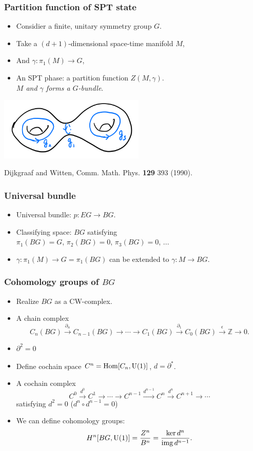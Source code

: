 \documentclass[xcolor=table, aspectratio=43,ignorenonframetext]{beamer}
\DeclareMathOperator{\img}{img}
\DeclareMathOperator{\hhom}{Hom}
\begin{document}
\begin{frame}
	\frametitle{Partition function of SPT state}
	\begin{itemize}
		\item Considier a finite, unitary symmetry group $G$.
		\item Take a $(d+1)$-dimensional space-time manifold $M$,
		\item And $\gamma:\pi_1(M)\rightarrow G$,
		\item An SPT phase: a partition function $Z(M,\gamma)$.\\
		\emph{$M$ and $\gamma$ forms a $G$-bundle}.
	\end{itemize}
	\begin{center}
		\includegraphics[height=3cm]{manifold}
	\end{center}
	{\small Dijkgraaf and Witten, Comm. Math. Phys. \textbf{129} 393 (1990).}
\end{frame}

\begin{frame}
	\frametitle{Universal bundle}
	\begin{itemize}
		\item Universal bundle: $p: EG \rightarrow BG$.
		\item Classifying space: $BG$ satisfying\\
		$\pi_1(BG) = G$, $\pi_2(BG)=0$, $\pi_3(BG)=0$, ...
		\item $\gamma:\pi_1(M)\rightarrow G=\pi_1(BG)$ can be extended to $\gamma:M\rightarrow BG$.
	\end{itemize}
\end{frame}

\begin{frame}
	\frametitle{Cohomology groups of $BG$}
	\begin{itemize}
		\item Realize $BG$ as a CW-complex.
		\item A chain complex
		\[C_n(BG)\xrightarrow{\partial_n}
		C_{n-1}(BG)\rightarrow\cdots\rightarrow
		C_1(BG)\xrightarrow{\partial_1}
		C_0(BG)\xrightarrow{\epsilon}\mathbb Z\rightarrow0.\]
		\item $\partial^2=0$
		\item Define cochain space $C^n=\hhom[C_n,\text U(1)]$, $d = \partial^\ast$.
		\item A cochain complex
		\[C^0\xrightarrow{d^0}C^1\rightarrow\cdots\rightarrow C^{n-1}\xrightarrow{d^{n-1}}C^n\xrightarrow{d^n}C^{n+1}\rightarrow\cdots\]
		satisfying $d^2=0$ ($d^n\circ d^{n-1}=0$)
		\item We can define cohomology groups:
		\[H^n[BG,\text U(1)] = \frac{Z^n}{B^n} = \frac{\ker d^n}{\img d^{n-1}}.\]
	\end{itemize}
\end{frame}
\end{document}
